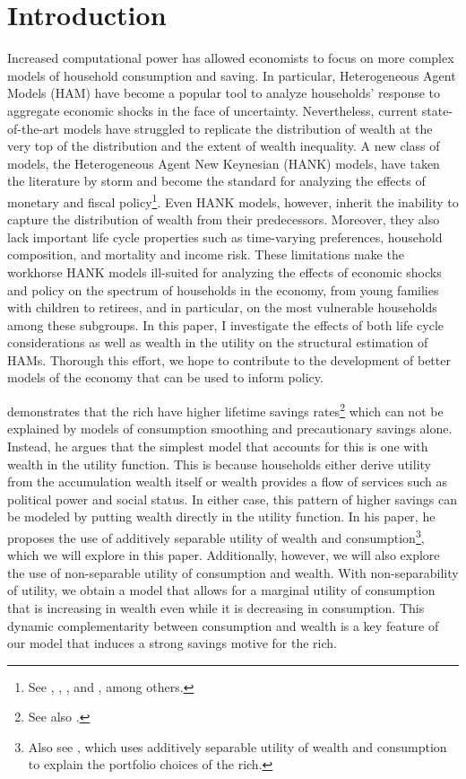 \documentclass{article}
\begin{document}
\section{Introduction}\label{Introduction}

Increased computational power has allowed economists to focus on more complex models of household consumption and saving. In particular, Heterogeneous Agent Models (HAM) have become a popular tool to analyze households' response to aggregate economic shocks in the face of uncertainty. Nevertheless, current state-of-the-art models have struggled to replicate the distribution of wealth at the very top of the distribution and the extent of wealth inequality. A new class of models, the Heterogeneous Agent New Keynesian (HANK) models, have taken the literature by storm and become the standard for analyzing the effects of monetary and fiscal policy\footnote{See \cite{Kaplan_2018}, \cite{Acharya_2020}, \cite{Ravn_2020}, and \cite{Auclert_2020}, among others.}. Even HANK models, however, inherit the inability to capture the distribution of wealth from their predecessors. Moreover, they also lack important life cycle properties such as time-varying preferences, household composition, and mortality and income risk. These limitations make the workhorse HANK models ill-suited for analyzing the effects of economic shocks and policy on the spectrum of households in the economy, from young families with children to retirees, and in particular, on the most vulnerable households among these subgroups. In this paper, I investigate the effects of both life cycle considerations as well as wealth in the utility on the structural estimation of HAMs. Thorough this effort, we hope to contribute to the development of better models of the economy that can be used to inform policy.

\cite{Carroll_1998} demonstrates that the rich have higher lifetime savings rates\footnote{See also \cite{Dynan_2004}.} which can not be explained by models of consumption smoothing and precautionary savings alone. Instead, he argues that the simplest model that accounts for this is one with wealth in the utility function. This is because households either derive utility from the accumulation wealth itself or wealth provides a flow of services such as political power and social status. In either case, this pattern of higher savings can be modeled by putting wealth directly in the utility function. In his paper, he proposes the use of additively separable utility of wealth and consumption\footnote{Also see \cite{Carroll_2000}, which uses additively separable utility of wealth and consumption to explain the portfolio choices of the rich.}, which we will explore in this paper. Additionally, however, we will also explore the use of non-separable utility of consumption and wealth. With non-separability of utility, we obtain a model that allows for a marginal utility of consumption that is increasing in wealth even while it is decreasing in consumption. This dynamic complementarity between consumption and wealth is a key feature of our model that induces a strong savings motive for the rich.
\end{document}
